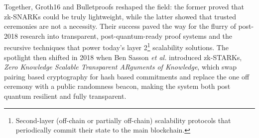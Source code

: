 Together, Groth16 and Bulletproofs reshaped the field: the former proved that zk-SNARKs could be truly lightweight, while the latter showed that trusted ceremonies are not a necessity.
Their success paved the way for the flurry of post-2018 research into transparent, post-quantum-ready proof systems and the recursive techniques that power today's layer 2\footnote{Second-layer (off-chain or partially off-chain) scalability protocols that periodically commit their state to the main blockchain. } scalability solutions. 
The spotlight then shifted in 2018 when Ben Sasson \textit{et al.} introduced zk-STARKs, \textit{Zero Knowledge Scalable Transparent ARguments of Knowledge}, which swap pairing based cryptography for hash based commitments and replace the one off ceremony with a public randomness beacon, making the system both post quantum resilient and fully transparent\cite{benSassonSTARK2018}. 

